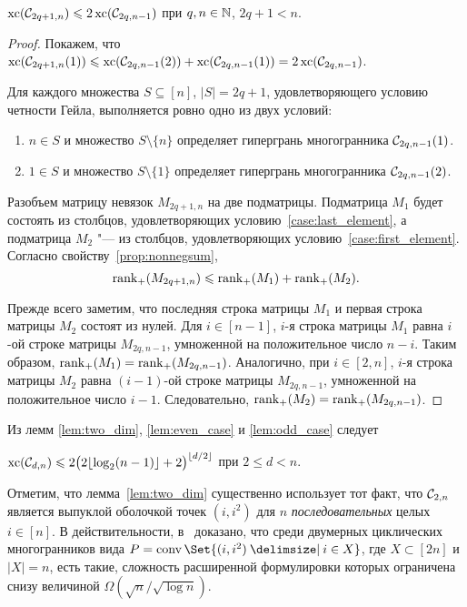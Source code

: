 \begin{lemma}
\label{lem:odd_case}
$\operatorname{xc}({\mathcal C}_{2q+1,n}) \leqslant 2 \operatorname{xc}({\mathcal C}_{2q,n-1})$ при $q,n\in\mathbb{N}$, $2q+1 < n$.
\end{lemma}
%
\begin{proof}
Покажем, что $\operatorname{xc}({\mathcal C}_{2q+1, n}(1)) \leqslant \operatorname{xc}({\mathcal C}_{2q, n-1} (2)) + \operatorname{xc}({\mathcal C}_{2q, n-1}(1)) = 2 \operatorname{xc}({\mathcal C}_{2q, n-1})$.
	
Для каждого множества $S\subseteq[n]$, $|S|=2q+1$, удовлетворяющего условию четности Гейла, выполняется ровно одно из двух условий:
%
\begin{enumerate}
	\item \label{case:last_element} $n\in S$ и множество $S\setminus\{n\}$ определяет гипергрань многогранника ${\mathcal C}_{2q, n-1}(1)$.
	\item \label{case:first_element} $1\in S$ и множество $S\setminus\{1\}$ определяет гипергрань многогранника ${\mathcal C}_{2q, n-1}(2)$.
\end{enumerate}
Разобъем матрицу невязок $M_{2q+1, n}$ на две подматрицы. Подматрица $M_1$ будет состоять из столбцов, удовлетворяющих условию~\ref{case:last_element}, а подматрица $M_2$ "--- из столбцов, удовлетворяющих условию~\ref{case:first_element}.
Согласно свойству~\ref{prop:nonnegsum}, 
\[
\operatorname{rank}_+(M_{2q+1, n}) \leqslant \operatorname{rank}_+(M_1) + \operatorname{rank}_+(M_2).
\]

Прежде всего заметим, что последняя строка матрицы $M_1$ и первая строка матрицы $M_2$ состоят из нулей.
Для $i \in [n-1]$, $i$-я строка матрицы $M_1$ равна $i$-ой строке матрицы $M_{2q, n-1}$, умноженной на положительное число $n-i$.
Таким образом, $\operatorname{rank}_+(M_1) = \operatorname{rank}_+(M_{2q, n-1})$.
Аналогично, при $i \in [2,n]$, $i$-я строка матрицы $M_2$ равна $(i-1)$-ой строке матрицы $M_{2q, n-1}$, умноженной на положительное число $i-1$.
Следовательно, $\operatorname{rank}_+(M_2) = \operatorname{rank}_+(M_{2q, n-1})$.
\end{proof}

Из лемм \ref{lem:two_dim}, \ref{lem:even_case} и \ref{lem:odd_case} следует

\begin{theorem}
\label{thm:main}
$\operatorname{xc}({\mathcal C}_{d,n}) \leqslant 2\bigl(2\lfloor \log_2(n-1)\rfloor+2\bigr)^{\lfloor d/2 \rfloor}$ при $2 \le d < n$.
\end{theorem}

Отметим, что лемма~\ref{lem:two_dim} существенно использует тот факт, что ${\mathcal C}_{2,n}$ является выпуклой оболочкой точек $(i,i^2)$ для $n$ \emph{последовательных} целых $i \in [n]$. В действительности, в~\cite{Fiorini:2012polygons} доказано, что среди двумерных циклических многогранников вида $P = \conv \Set{(i,i^2) \given i \in X}$, где $X \subset [2n]$ и $|X| = n$, есть такие, сложность расширенной формулировки которых ограничена снизу величиной $\Omega(\sqrt{n} / \sqrt{\log n})$. 



